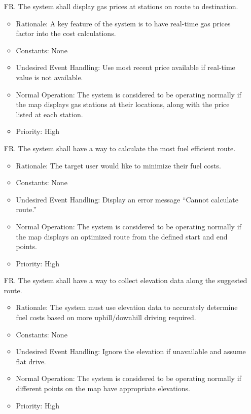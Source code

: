 \documentclass[12pt]{article}
\newcounter{reqnum} %
\begin{document}
\begin{itemize}
\item[FR\refstepcounter{reqnum}\thereqnum. ] The system shall display gas prices at stations on route to destination.
\begin{itemize}
    \item Rationale: A key feature of the system is to have real-time gas prices factor into the cost calculations.
    \item Constants: None
    \item Undesired Event Handling: Use most recent price available if real-time value is not available.
    \item Normal Operation: The system is considered to be operating normally if the map displays gas stations at their locations, along with the price listed at each station.
	\item Priority: High
\end{itemize}

\item[FR\refstepcounter{reqnum}\thereqnum. ] The system shall have a way to calculate the most fuel efficient route.
\begin{itemize}
    \item Rationale: The target user would like to minimize their fuel costs.
    \item Constants: None
    \item Undesired Event Handling: Display an error message “Cannot calculate route.”
    \item Normal Operation: The system is considered to be operating normally if the map displays an optimized route from the defined start and end points.
	\item Priority: High
\end{itemize}

\item[FR\refstepcounter{reqnum}\thereqnum. ] The system shall have a way to collect elevation data along the suggested route.
\begin{itemize}
    \item Rationale: The system must use elevation data to accurately determine fuel costs based on more uphill/downhill driving required.
    \item Constants: None
    \item Undesired Event Handling: Ignore the elevation if unavailable and assume flat drive.
    \item Normal Operation: The system is considered to be operating normally if different points on the map have appropriate elevations.
	\item Priority: High
\end{itemize}


\end{itemize}
\end{document}
